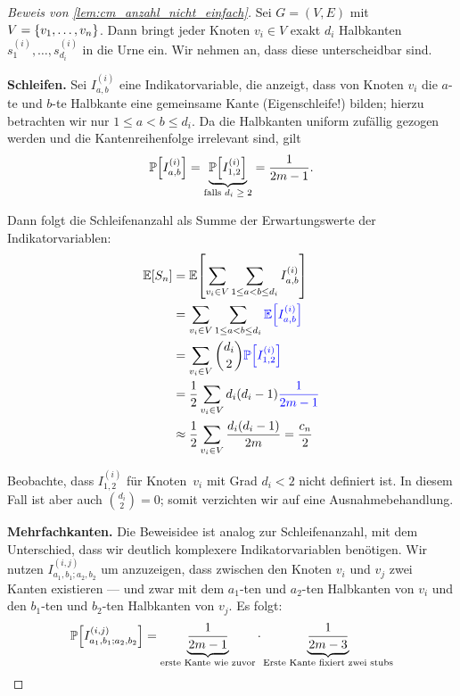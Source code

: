 \begin{proof}[Beweis von \cref{lem:cm_anzahl_nicht_einfach}]
    Sei $G= (V,E)$ mit $V = \left\{v_1, \ldots, v_n\right\}$.
    Dann bringt jeder Knoten $v_i \in V$ exakt $d_i$ Halbkanten $s_{1}^{(i)}, \ldots, s_{d_i}^{(i)}$ in die Urne ein.
    Wir nehmen an, dass diese unterscheidbar sind.

    \textbf{Schleifen. }
    Sei $I_{a,b}^{(i)}$ eine Indikatorvariable, die anzeigt, dass von Knoten $v_i$ die $a$-te und $b$-te Halbkante eine gemeinsame Kante (Eigenschleife!) bilden;
    hierzu betrachten wir nur $1\le a < b \le d_i$.
    Da die Halbkanten uniform zufällig gezogen werden und die Kantenreihenfolge irrelevant sind, gilt
    \begin{align}
        \mathbb{P}\!\left[I_{a,b}^{(i)}\right] = \underbrace{\mathbb{P}\!\left[I_{1,2}^{(i)}\right]}_\text{falls $d_i \ge 2$} = \frac{1}{2m - 1}.
    \end{align}

    \noindent
    Dann folgt die Schleifenanzahl als Summe der Erwartungswerte der Indikatorvariablen:
    \begin{align}
        \mathbb{E}\!\left[S_n\right] & = \mathbb{E}\!\left[\sum_{v_i \in V} \sum_{1 \le a < b \le d_i} I_{a,b}^{(i)}\right]                   \\
                   & = \sum_{v_i \in V} \sum_{1 \le a < b \le d_i} \textcolor{blue}{\mathbb{E}\!\left[I_{a,b}^{(i)}\right]} \\
                   & = \sum_{v_i \in V} \binom{d_i}{2} \textcolor{blue}{\mathbb{P}\!\left[I_{1,2}^{(i)}\right]}             \\
                   & = \frac 1 2 \sum_{v_i \in V} d_i (d_i - 1) \textcolor{blue}{\frac{1}{2m - 1}}        \\
                   & \approx \frac 1 2 \sum_{v_i \in V} \frac{d_i (d_i - 1)}{2 m} = \frac{c_n}{2}
    \end{align}

    Beobachte, dass $I_{1,2}^{(i)}$ für Knoten~$v_i$ mit Grad $d_i <2$ nicht definiert ist.
    In diesem Fall ist aber auch $\binom{d_i}{2} = 0$; somit verzichten wir auf eine Ausnahmebehandlung.

    \textbf{Mehrfachkanten.}
    Die Beweisidee ist analog zur Schleifenanzahl, mit dem Unterschied, dass wir deutlich komplexere Indikatorvariablen benötigen.
    Wir nutzen $I^{(i,j)}_{a_1,b_1;a_2,b_2}$ um anzuzeigen, dass zwischen den Knoten $v_i$ und $v_j$ zwei Kanten existieren --- und zwar mit dem $a_1$-ten und $a_2$-ten Halbkanten von $v_i$ und den $b_1$-ten und $b_2$-ten Halbkanten von $v_j$.
    Es folgt:
    \begin{align}
        \mathbb{P}\!\left[I^{(i,j)}_{a_1,b_1;a_2,b_2}\right] = \underbrace{\frac{1}{2m - 1}}_\text{erste Kante wie zuvor} \cdot \underbrace{\frac{1}{2m - 3}}_\text{Erste Kante fixiert zwei stubs}
    \end{align}


\end{proof}
